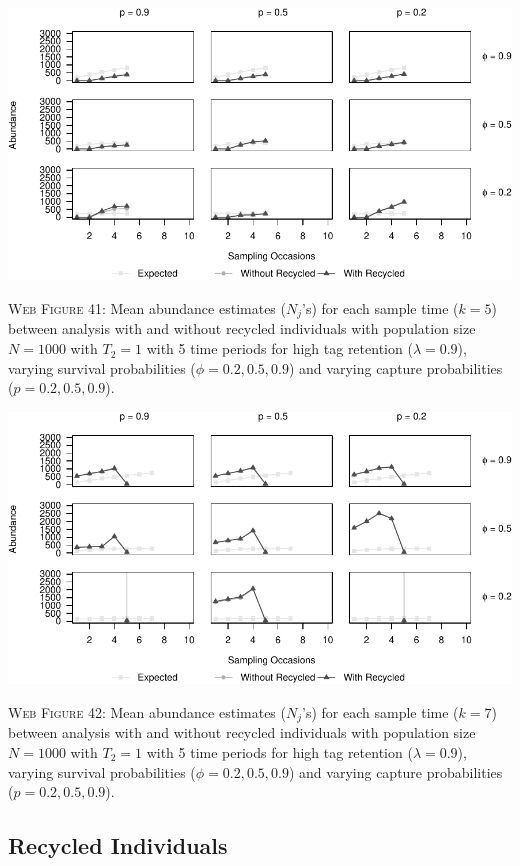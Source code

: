 \documentclass[]{article}
\begin{document}
\newpage

\includegraphics{Appendix_BW_files/figure-latex/41_abundance_H_GJSTL5-1.pdf}

\textsc{Web Figure 41:} Mean abundance estimates (\(N_j\)'s) for each
sample time (\(k=5\)) between analysis with and without recycled
individuals with population size \(N=1000\) with \(T_2=1\) with 5 time
periods for high tag retention (\(\lambda=0.9\)), varying survival
probabilities (\(\phi=0.2,0.5,0.9\)) and varying capture probabilities
(\(p=0.2,0.5,0.9\)).

\includegraphics{Appendix_BW_files/figure-latex/42_abundance_H_GJSTL6-1.pdf}

\textsc{Web Figure 42:} Mean abundance estimates (\(N_j\)'s) for each
sample time (\(k=7\)) between analysis with and without recycled
individuals with population size \(N=1000\) with \(T_2=1\) with 5 time
periods for high tag retention (\(\lambda=0.9\)), varying survival
probabilities (\(\phi=0.2,0.5,0.9\)) and varying capture probabilities
(\(p=0.2,0.5,0.9\)).

\newpage

\subsection{Recycled Individuals}\label{recycled-individuals}
\end{document}
